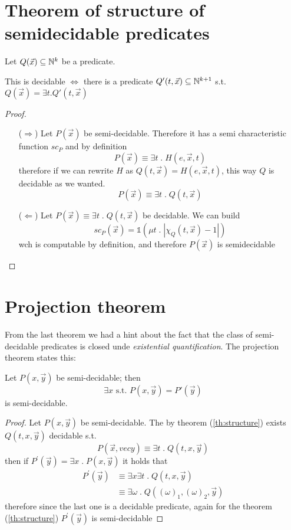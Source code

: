 \section {Theorem of structure of semidecidable predicates}

\begin{theorem}\label{th:structure}
  Let $ Q(\vec{x}) \subseteq \mathbb{N}^k $ be a predicate.

  This is decidable $ \Leftrightarrow $ there is a predicate $
  Q'(t,\vec{x}) \subseteq \mathbb{N}^{k+1} $ s.t. $ Q(\vec{x}) = \exists
  t. Q'(t,\vec{x}) $
  \begin{proof}
    \begin{itemize}
    \item[($\Rightarrow$)] Let $P(\vec{x})$ be
      semi-decidable. Therefore it has a semi characteristic function
      $sc_P$ and by definition
      \[
        P(\vec{x}) \equiv \exists t \; . \; H(e,\vec{x}, t)
      \]
      therefore if we can rewrite $H$ as
      $Q(t, \vec{x}) = H(e,\vec{x}, t)$, this way $Q$ is decidable as
      we wanted. \[P(\vec{x}) \equiv \exists t \; . \; Q(t, \vec{x})\]

    \item[($\Leftarrow$)] Let
      \(P(\vec{x}) \equiv \exists t \; . \; Q(t, \vec{x})\) be
      decidable. We can build
      \[
        sc_P(\vec{x}) = \mathds{1}(\mu t \; . \; |\chi_Q(t,\vec{x}) - 1|)
      \]
      wch is computable by definition, and therefore $P(\vec{x})$ is
      semidecidable
    \end{itemize} 
  \end{proof}
\end{theorem}

\section {Projection theorem}

From the last theorem we had a hint about the fact that the class of
semi-decidable predicates is closed unde \emph{existential
  quantification}. The projection theorem states this:

\begin{theorem}
  Let $ P(x,\vec{y}) $ be semi-decidable; then
  \[
    \exists x \mbox{ s.t. } P(x,\vec{y}) = P'(\vec{y})
  \]
  is semi-decidable.

  \begin{proof}
    Let $P(x,\vec{y})$ be semi-decidable. The by theorem
    (\ref{th:structure}) exists $Q(t,x,\vec{y})$ decidable s.t.
    \[
      P(\vec{x}, vec{y}) \equiv \exists t \; . \; Q(t,x,\vec{y})
    \]
    then if $P^\prime(\vec{y}) = \exists x \; . \; P(x, \vec{y})$ it
    holds that
    \[
      \begin{split}
        P^\prime(\vec{y}) &\equiv \exists x \exists t \; . \;
        Q(t,x,\vec{y}) \\
        &\equiv \exists \omega \; . \; Q((\omega)_1, (\omega)_2, \vec{y})
      \end{split}
    \]
    therefore since the last one is a decidable predicate, again for
    the theorem (\ref{th:structure}) $P^\prime(\vec{y})$ is
    semi-decidable
  \end{proof}
\end{theorem}

